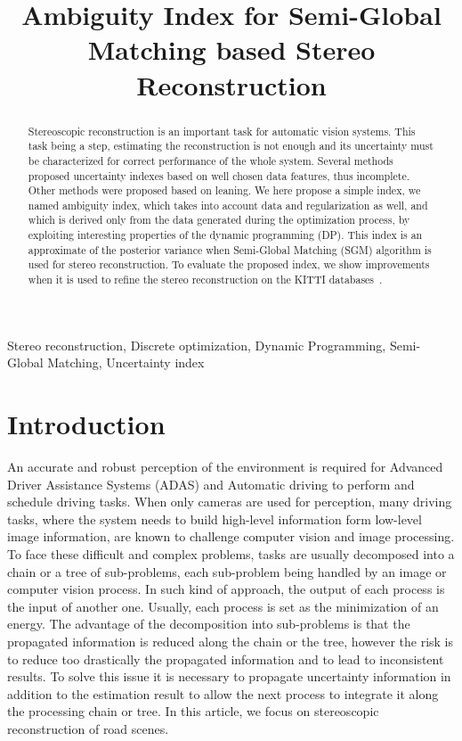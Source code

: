 \documentclass{article}
\title{Ambiguity Index for Semi-Global Matching based Stereo Reconstruction }
\begin{document}
\ninept
%
\maketitle
%

\begin{abstract}
Stereoscopic reconstruction is an important task for automatic vision systems. This task being a step, estimating the reconstruction is not enough and its uncertainty must be characterized for correct performance of the whole system. Several methods proposed uncertainty indexes based on well chosen data features, thus incomplete. Other methods were proposed based on leaning. We here propose a simple index, we named ambiguity index, which takes into account data and regularization as well, and which is derived only from the data generated during the optimization process, by exploiting interesting properties of the dynamic programming (DP). This index is an approximate of the posterior variance when Semi-Global Matching (SGM) algorithm is used for stereo reconstruction. To evaluate the proposed index, we show improvements when it is used to refine the stereo reconstruction on the KITTI databases~\cite{geiger13, menze15}.
\end{abstract}
\begin{keywords}
Stereo reconstruction, Discrete optimization, Dynamic Programming, Semi-Global Matching, Uncertainty index
\end{keywords}

\section{Introduction}
\label{sec:intro}

An accurate and robust perception of the environment is required for Advanced Driver Assistance Systems (ADAS) and Automatic driving to perform and schedule driving tasks. When only cameras are used for perception, many driving tasks, where the system needs to build high-level information form low-level image information, are known to challenge computer vision and image processing. To face these difficult and complex problems, tasks are usually decomposed into a chain or a tree of sub-problems, each sub-problem being handled by an image or computer vision process. In such kind of approach, the output of each process is the input of another one. Usually, each process is set as the minimization of an energy. The advantage of the decomposition into sub-problems is that the propagated information is reduced along the chain or the tree, however the risk is to reduce too drastically the propagated information and to lead to inconsistent results. To solve this issue it is necessary to propagate uncertainty information in addition to the estimation result to allow the next process to integrate it along the processing chain or tree. In this article, we focus on stereoscopic reconstruction of road scenes.
\end{document}
